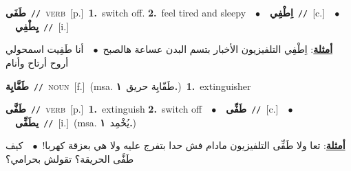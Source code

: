 \documentclass[10pt,a4paper,twoside]{article} %
\begin{document}
\begin{multicols}{2}
{\setlength\topsep{0pt}\textbf{\foreignlanguage{arabic}{طَفَى}}\ {\color{gray}\texttt{//}\color{black}}\ \textsc{verb}\ [p.]\ \textbf{1.}~switch off.  \textbf{2.}~feel tired and sleepy\ \ $\bullet$\ \ \setlength\topsep{0pt}\textbf{\foreignlanguage{arabic}{اِطْفِي}}\ {\color{gray}\texttt{//}\color{black}}\ [c.]\ \ $\bullet$\ \ \setlength\topsep{0pt}\textbf{\foreignlanguage{arabic}{يِطْفِي}}\ {\color{gray}\texttt{//}\color{black}}\ [i.]\  \begin{flushright}\color{gray}\foreignlanguage{arabic}{\textbf{\underline{\foreignlanguage{arabic}{أمثلة}}}: اِطْفِي التلفيزيون الأخبار بتسم البدن عساعة هالصبح\ $\bullet$\ \  أنا طَفِيت اسمحولي أروح أرتاح وأنام}\end{flushright}\color{black}} \vspace{2mm}

{\setlength\topsep{0pt}\textbf{\foreignlanguage{arabic}{طَفَّايِة}}\ {\color{gray}\texttt{//}\color{black}}\ \textsc{noun}\ [f.]\ \color{gray}(msa. \foreignlanguage{arabic}{طَفّايِة حريق}~\foreignlanguage{arabic}{\textbf{١.}})\color{black}\ \textbf{1.}~extinguisher\ } \vspace{2mm}

{\setlength\topsep{0pt}\textbf{\foreignlanguage{arabic}{طَفَّى}}\ {\color{gray}\texttt{//}\color{black}}\ \textsc{verb}\ [p.]\ \textbf{1.}~extinguish  \textbf{2.}~switch off\ \ $\bullet$\ \ \setlength\topsep{0pt}\textbf{\foreignlanguage{arabic}{طَفِّى}}\ {\color{gray}\texttt{//}\color{black}}\ [c.]\ \ $\bullet$\ \ \setlength\topsep{0pt}\textbf{\foreignlanguage{arabic}{يطَفِّى}}\ {\color{gray}\texttt{//}\color{black}}\ [i.]\ \color{gray}(msa. \foreignlanguage{arabic}{يُخْمِد}~\foreignlanguage{arabic}{\textbf{١.}})\color{black}\  \begin{flushright}\color{gray}\foreignlanguage{arabic}{\textbf{\underline{\foreignlanguage{arabic}{أمثلة}}}: تعا ولا طَفِّى التلفيزيون مادام فش حدا بتفرج عليه ولا هي بعزقة كهربا!\ $\bullet$\ \  كيف طَفَّى الحريقة؟ تقولش بحرامي؟}\end{flushright}\color{black}} \vspace{2mm}


\end{multicols}
\end{document}
